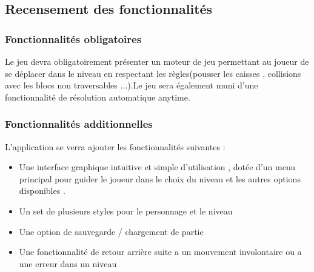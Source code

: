\documentclass{article}
\begin{document}
		\subsection{Recensement des fonctionnalités}
		\vspace{1cm}
			\subsubsection{Fonctionnalités obligatoires}
			Le jeu devra obligatoirement présenter un moteur de jeu permettant au joueur de se déplacer dans le niveau en respectant les règles(pousser les caisses , collisions avec les blocs non traversables ...).Le jeu sera également muni d'une fonctionnalité de résolution automatique anytime.
			\subsubsection{Fonctionnalités additionnelles}
			L'application se verra ajouter les fonctionnalités suivantes :
			\begin{itemize}
			\item Une interface graphique intuitive et simple d'utilisation , dotée d'un menu principal pour guider le joueur dans le choix du niveau et les autres options disponibles .
			\item Un set de plusieurs styles pour le personnage et le niveau 
			\item Une option de sauvegarde / chargement de partie
			\item Une fonctionnalité de retour arrière suite a un mouvement involontaire ou a une erreur dans un niveau 
			\end{itemize}
\end{document}
